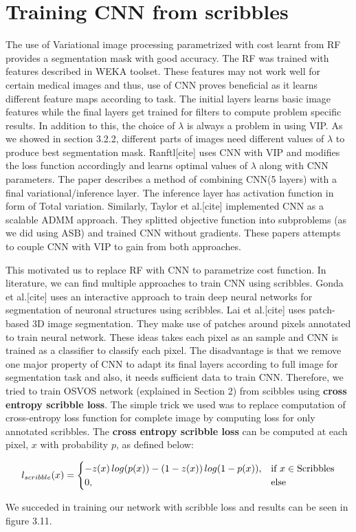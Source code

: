 \chapter{Training CNN from scribbles}
The use of Variational image processing parametrized with cost learnt from RF provides a segmentation mask with good accuracy. The RF was trained with features described in WEKA toolset. These features may not work well for certain medical images and thus, use of CNN proves beneficial as it learns different feature maps according to task. The initial layers learns basic image features while the final layers get trained for filters to compute problem specific results. In addition to this, the choice of $\lambda$ is always a problem in using VIP. As we showed in section 3.2.2, different parts of images need different values of $\lambda$ to produce best segmentation mask. Ranftl[cite] uses CNN with VIP and modifies the loss function accordingly and learns optimal values of $\lambda$ along with CNN parameters. The paper describes a method of combining CNN(5 layers) with a final variational/inference layer. The inference layer has activation function in form of Total variation. Similarly, Taylor et al.[cite] implemented CNN as a scalable ADMM approach. They splitted objective function into subproblems (as we did using ASB) and trained CNN without gradients. These papers attempts to couple CNN with VIP to gain from both approaches. \par

This motivated us to replace RF with CNN to parametrize cost function. In literature, we can find multiple approaches to train CNN using scribbles. Gonda et al.[cite] uses an interactive approach to train deep neural networks for segmentation of neuronal structures using scribbles. Lai et al.[cite] uses patch-based 3D image segmentation. They make use of patches around pixels annotated to train neural network. These ideas takes each pixel as an sample and CNN is trained as a classifier to classify each pixel. The disadvantage is that we remove one major property of CNN to adapt its final layers according to full image for segmentation task and also, it needs sufficient data to train CNN. Therefore, we tried to train OSVOS network (explained in Section 2) from scibbles using \textbf{cross entropy scribble loss}. The simple trick we used was to replace computation of cross-entropy loss function for complete image by computing loss for only annotated scribbles. The \textbf{cross entropy scribble loss} can be computed at each pixel, $x$ with probability $p$, as defined below:

\begin{align*}
\mathop{{}l_{scribble}}(x) =
\begin{cases}
  -z(x)\,log(p(x)) - (1 - z(x))\,log(1 - p(x)), & \text{if}\ x \in \text{Scribbles}  \\
  0, & \text{else}
\end{cases}
\end{align*}

We succeded in training our network with scribble loss and results can be seen in figure 3.11. 